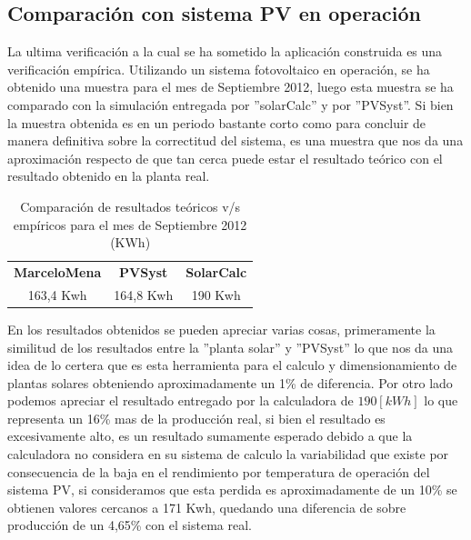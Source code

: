\newpage
\subsection{Comparación con sistema PV en operación}
La ultima verificación a la cual se ha sometido la aplicación construida es una verificación empírica. Utilizando un sistema fotovoltaico en operación, se ha obtenido una muestra para el mes de Septiembre 2012, luego esta muestra se ha comparado con la simulación entregada por ''solarCalc'' y por ''PVSyst''. Si bien la muestra obtenida es en un periodo bastante corto como para concluir de manera definitiva sobre la correctitud del sistema, es una muestra que nos da una aproximación respecto de que tan cerca puede estar el resultado teórico con el resultado obtenido en la planta real.\\

\begin{table}[h!]
\caption{Comparación de resultados teóricos v/s empíricos para el mes de Septiembre 2012 (KWh)}
\centering
\begin{tabular}{|c|c|c|}
        \hline
        \textbf{MarceloMena}&\textbf{PVSyst}&\textbf{SolarCalc}\\
        163,4 Kwh&    164,8 Kwh&   190 Kwh\\
        \hline
\end{tabular}
\end{table}

En los resultados obtenidos se pueden apreciar varias cosas, primeramente la similitud de los resultados entre la ''planta solar'' y ''PVSyst'' lo que nos da una idea de lo certera que es esta herramienta para el calculo y dimensionamiento de plantas solares obteniendo aproximadamente un 1\% de diferencia. Por otro lado podemos apreciar el resultado entregado por la calculadora de $190 [kWh]$ lo que representa un 16\% mas de la producción real, si bien el resultado es excesivamente alto, es un resultado sumamente esperado debido a que la calculadora no considera en su sistema de calculo la variabilidad que existe por consecuencia de la baja en el rendimiento por temperatura de operación del sistema PV, si consideramos que esta perdida es aproximadamente de un 10\% se obtienen valores cercanos a 171 Kwh, quedando una diferencia de sobre producción de un 4,65\% con el sistema real.
